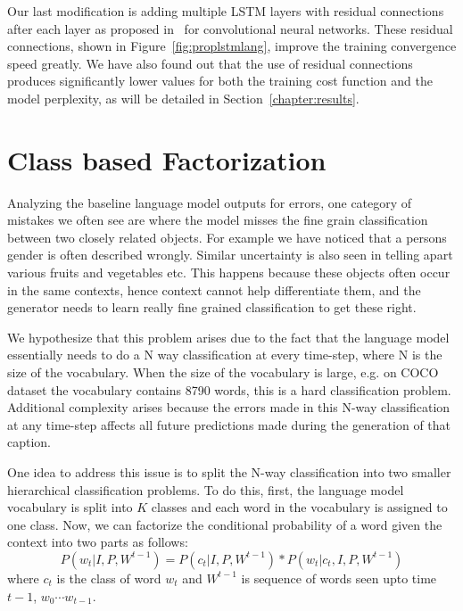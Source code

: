 Our last modification is adding multiple LSTM layers with residual connections
after each layer as proposed in~\cite{He2015} for convolutional neural networks.
These residual connections, shown in Figure~\ref{fig:proplstmlang}, improve the
training convergence speed greatly.
We have also found out that the use of residual connections produces
significantly lower values for both the training cost function and the model
perplexity, as will be detailed in Section~\ref{chapter:results}.

\section{Class based Factorization}
Analyzing the baseline language model outputs for errors, one category of
mistakes we often see are where the model misses the fine grain
classification between two closely related objects.
For example we have noticed that a persons gender is often described wrongly.
Similar uncertainty is also seen in telling apart various fruits and vegetables etc.
This happens because these objects often occur in the same contexts, hence
context cannot help differentiate them, and the generator needs to learn really
fine grained classification to get these right.

We hypothesize that this problem arises due to the fact that the language model
essentially needs to do a N way classification at every time-step, where N is
the size of the vocabulary.
When the size of the vocabulary is large, e.g. on COCO dataset the vocabulary
contains 8790 words, this is a hard classification problem.
Additional complexity arises because the errors made in this N-way
classification at any time-step affects all future predictions made during the
generation of that caption.

One idea to address this issue is to split the N-way classification into two
smaller hierarchical classification problems.
To do this, first, the language model vocabulary is split into $K$ classes and
each word in the vocabulary is assigned to one class. 
Now, we can factorize the conditional probability of a word given the context
into two parts as follows:
\begin{equation}
  \label{eq:class} 
  P(w_t | I,P, W^{t-1}) = P(c_t| I,P, W^{t-1})*P(w_t | c_t, I,P,W^{t-1})
\end{equation}
\noindent where $c_t$ is the class of word $w_t$ and $W^{t-1}$ is sequence of words
seen upto time $t-1$, $w_0\cdots w_{t-1}$.

